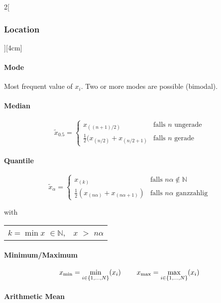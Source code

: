 \documentclass[8pt]{extarticle}
\begin{document}
\begin{multicols}{2}[\subsubsection{Location}][4cm] 

\paragraph{Mode}

 Most frequent value of $x_i$. Two or more modes are possible (bimodal).

\paragraph{Median}

$$\tilde{x}_{0.5}=\begin{cases} x_{((n+1)/2)} & \text{falls }n\text{ ungerade} \\ \frac{1}{2}(x_{(n/2)}+x_{(n/2+1)} & \text{falls }n\text{ gerade} \end{cases}$$

\paragraph{Quantile}

$$\tilde{x}_\alpha=\begin{cases} x_{(k)} & \text{falls } n\alpha \notin \mathbb{N}\\ \frac{1}{2}(x_{(n\alpha)}+ x_{(n\alpha+1)}) & \text{falls } n\alpha \text{ ganzzahlig} \end{cases}$$

with

\begin{tabular}{l l}
 $k=\min x$ $\in \mathbb{N}$, &  $x$ $>$ $n\alpha$ \\
\end{tabular}

\paragraph{Minimum/Maximum}


$$x_{\min}=\min_{i \in \{ 1,...,N\}} (x_i) \hspace{0.8cm}   x_{\max}=\max_{i \in \{ 1,...,N\}} (x_i)$$
 


\paragraph{Arithmetic Mean}


\end{multicols}
\end{document}
